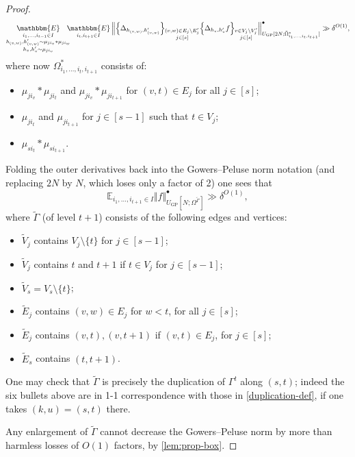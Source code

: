 \documentclass[11pt,reqno]{amsart}
\numberwithin{equation}{section}
\theoremstyle{definition}
\theoremstyle{remark}
\newcommand{\mb}{\mathbb}
\newcommand{\mbm}{\mathbbm}
\newcommand\E{\mb{E}}
\DeclareMathOperator*{\bigavg}{\scalerel*{\mbm{E}}{(}}
\newcommand\GP{\operatorname{GP}}
\begin{document}
\begin{proof}
\[ \bigavg_{\substack{i_1,\dots, i_{t-1} \in I \\ h_{(v,w)}, h'_{(v,w)} \sim \mu_{ji_v} \ast \mu_{ji_w} \\ h_v, h'_v \sim \mu_{j i_v}}}  \!\!\!\!  \bigavg_{i_t, i_{t+1} \in I}\Big\Vert 
\Big\{ \Delta_{h_{(v,w)}, h'_{(v,w)}} \Big\}_{\substack{(v,w) \in E_j\setminus E'_j \\ j \in [s]}} \Big\{ \Delta_{h_v, h'_v} f \Big\}_{\substack{v \in V_j \setminus V'_j \\ j \in [s]}}
\Big\Vert^{\bullet}_{U_{\GP}[2N; \tilde \Omega^*_{i_1,\dots, i_t, i_{t+1}}]} \gg \delta^{O(1)}, \] where now $\Omega^*_{i_1,\dots, i_t, i_{t+1}}$ consists of:
\begin{itemize}
\item $\mu_{ji_v} \ast \mu_{ji_t}$ and $\mu_{ji_v} \ast \mu_{ji_{t+1}}$ for $(v,t) \in E_j$ for all $j \in [s]$;
\item $\mu_{ji_t}$ and $\mu_{ji_{t+1}}$ for $j \in [s-1]$ such that $t \in V_j$;
\item $\mu_{si_t} \ast \mu_{si_{t+1}}$.   
\end{itemize}
Folding the outer derivatives back into the Gowers--Peluse norm notation (and replacing $2N$ by $N$, which loses only a factor of 2) one sees that 
\[ \E_{i_1,\dots, i_{t+1} \in I} \Vert  f  \Vert^{\bullet}_{U_{\GP}[N;\Omega^{\tilde\Gamma}]} \gg  \delta^{O(1)},\]
where $\tilde\Gamma$ (of level $t+1$) consists of the following edges and vertices:
\begin{itemize}


\item $\tilde V_j$ contains $V_j \setminus \{t\}$ for $j \in [s-1]$;
\item $\tilde V_j$ contains $t$ and $t+1$ if $t \in V_j$ for $j \in [s-1]$;
\item $\tilde V_s = V_s \setminus \{t\}$;
\item $\tilde E_j$ contains $(v,w) \in E_j$ for $w < t$, for all $j \in [s]$;
\item $\tilde E_j$ contains $(v,t), (v, t+1)$ if $(v,t) \in E_j$, for $j \in [s]$;
\item $\tilde E_s$ contains $(t, t+1)$.
\end{itemize}
One may check that $\tilde\Gamma$ is precisely the duplication of $\Gamma^t$ along $(s,t)$; indeed the six bullets above are in 1-1 correspondence with those in \cref{duplication-def}, if one takes $(k,u) = (s,t)$ there.

Any enlargement of $\tilde\Gamma$ cannot decrease the Gowers--Peluse norm by more than harmless losses of $O(1)$ factors, by \cref{lem:prop-box}.
\end{proof}
 
\end{document}
